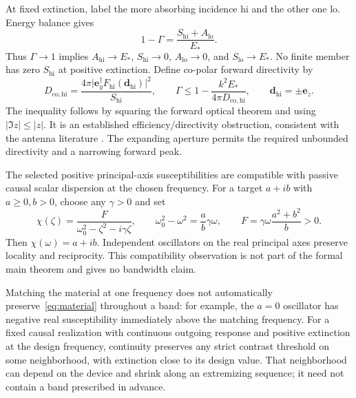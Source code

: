 \documentclass[11pt]{article}
\newcommand{\ey}{\mathbf e_y}
\newcommand{\ez}{\mathbf e_z}
\newcommand{\abs}[1]{\lvert #1\rvert}
\begin{document}
At fixed extinction, label the more absorbing incidence $\mathrm{hi}$ and the other one $\mathrm{lo}$. Energy balance gives
\begin{equation}\label{eq:deficit}
 1-\Gamma=\frac{S_{\mathrm{hi}}+A_{\mathrm{lo}}}{E_*}.
\end{equation}
Thus $\Gamma\to1$ implies $A_{\mathrm{hi}}\to E_*$, $S_{\mathrm{hi}}\to0$, $A_{\mathrm{lo}}\to0$, and $S_{\mathrm{lo}}\to E_*$. No finite member has zero $S_{\mathrm{hi}}$ at positive extinction. Define co-polar forward directivity by
\begin{equation}\label{eq:directivity}
 D_{\mathrm{co},\mathrm{hi}}=\frac{4\pi\abs{\ey^\dagger F_{\mathrm{hi}}(\mathbf d_{\mathrm{hi}})}^2}{S_{\mathrm{hi}}},\qquad
 \Gamma\leq1-\frac{k^2E_*}{4\pi D_{\mathrm{co},\mathrm{hi}}},\qquad\mathbf d_{\mathrm{hi}}=\pm\ez.
\end{equation}
The inequality follows by squaring the forward optical theorem and using $\abs{\Im z}\leq\abs z$. It is an established efficiency/directivity obstruction, consistent with the antenna literature \citep{AndersenFrandsen2005}. The expanding aperture permits the required unbounded directivity and a narrowing forward peak.

The selected positive principal-axis susceptibilities are compatible with passive causal scalar dispersion at the chosen frequency. For a target $a+ib$ with $a\geq0,b>0$, choose any $\gamma>0$ and set
\begin{equation}\label{eq:lorentz}
 \chi(\zeta)=\frac{F}{\omega_0^2-\zeta^2-i\gamma\zeta},\qquad
 \omega_0^2-\omega^2=\frac{a}{b}\gamma\omega,\qquad
 F=\gamma\omega\frac{a^2+b^2}{b}>0.
\end{equation}
Then $\chi(\omega)=a+ib$. Independent oscillators on the real principal axes preserve locality and reciprocity. This compatibility observation is not part of the formal main theorem and gives no bandwidth claim.

Matching the material at one frequency does not automatically preserve~\eqref{eq:material} throughout a band: for example, the $a=0$ oscillator has negative real susceptibility immediately above the matching frequency. For a fixed causal realization with continuous outgoing response and positive extinction at the design frequency, continuity preserves any strict contrast threshold on some neighborhood, with extinction close to its design value. That neighborhood can depend on the device and shrink along an extremizing sequence; it need not contain a band prescribed in advance.
\end{document}
